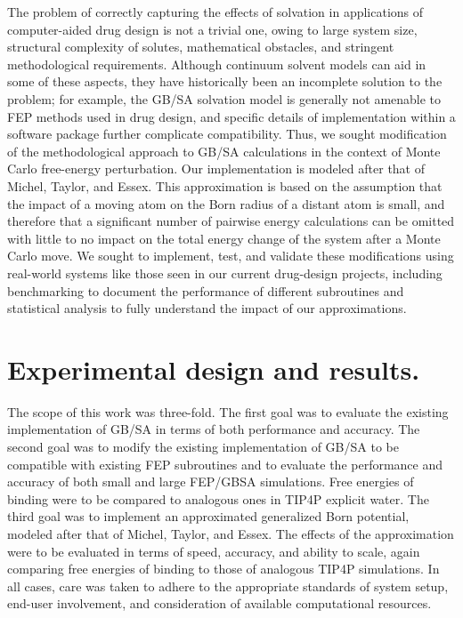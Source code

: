 \documentclass[12pt]{report}
\begin{document}
The problem of correctly capturing the effects of solvation in applications of computer-aided drug design is not a trivial one, owing to large system size, structural complexity of solutes, mathematical obstacles, and stringent methodological requirements. Although continuum solvent models can aid in some of these aspects, they have historically been an incomplete solution to the problem; for example, the GB/SA solvation model is generally not amenable to FEP methods used in drug design, and specific details of implementation within a software package further complicate compatibility. Thus, we sought modification of the methodological approach to GB/SA calculations in the context of Monte Carlo free-energy perturbation. Our implementation is modeled after that of Michel, Taylor, and Essex.\cite{michel4} This approximation is based on the assumption that the impact of a moving atom on the Born radius of a distant atom is small, and therefore that a significant number of pairwise energy calculations can be omitted with little to no impact on the total energy change of the system after a Monte Carlo move. We sought to implement, test, and validate these modifications using real-world systems like those seen in our current drug-design projects, including benchmarking to document the performance of different subroutines and statistical analysis to fully understand the impact of our approximations.


\section{Experimental design and results.}

The scope of this work was three-fold. The first goal was to evaluate the existing implementation of GB/SA in terms of both performance and accuracy. The second goal was to modify the existing implementation of GB/SA to be compatible with existing FEP subroutines and to evaluate the performance and accuracy of both small and large FEP/GBSA simulations. Free energies of binding were to be compared to analogous ones in TIP4P explicit water. The third goal was to implement an approximated generalized Born potential, modeled after that of Michel, Taylor, and Essex.\cite{michel4} The effects of the approximation were to be evaluated in terms of speed, accuracy, and ability to scale, again comparing free energies of binding to those of analogous TIP4P simulations. In all cases, care was taken to adhere to the appropriate standards of system setup, end-user involvement, and consideration of available computational resources.
\end{document}
